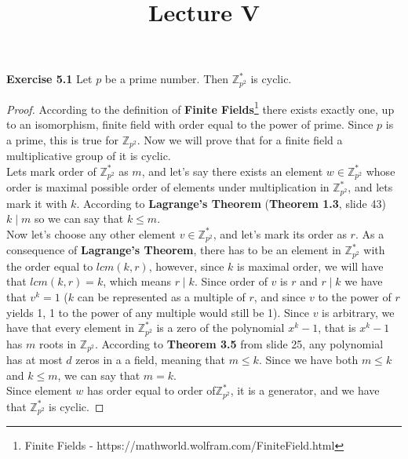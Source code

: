 \documentclass[a4paper]{article}
\title{\vspace{-2cm}Lecture V\vspace{-2cm}}
\date{}
\begin{document}
\maketitle
\noindent \textbf{Exercise 5.1}  Let $p$ be a prime number. Then $\mathbb{Z}^{*}_{p^2}$ is cyclic.
\begin{proof}
According to the definition of \textbf{Finite Fields}\footnote{Finite Fields - https://mathworld.wolfram.com/FiniteField.html} there exists exactly one, up to an isomorphism, finite field with order equal to the power of prime. Since $p$ is a prime, this is true for $\mathbb{Z}_{p^2}$. Now we will prove that for a finite field a multiplicative group of it is cyclic.\\
Lets mark order of $\mathbb{Z}_{p^2}^{*}$ as $m$, and let's say there exists an element $w \in \mathbb{Z}_{p^2}^{*}$ whose order is maximal possible order of elements under multiplication in $\mathbb{Z}_{p^2}^{*}$, and lets mark it with $k$. According to \textbf{Lagrange's Theorem} (\textbf{Theorem 1.3}, slide 43) $k \mid m$ so we can say that $k \leq m$.\\
Now let's choose any other element $v \in \mathbb{Z}_{p^2}^{*}$, and let's mark its order as $r$. As a consequence of \textbf{Lagrange's Theorem}, there has to be an element in $\mathbb{Z}_{p^2}^{*}$ with the order equal to $lcm(k,r)$, however, since $k$ is maximal order, we will have that $lcm(k,r)=k$, which means $r \mid k$. Since order of $v$ is $r$ and $r \mid k$ we have that $v^{k} = 1$ ($k$ can be represented as a multiple of $r$, and since $v$ to the power of $r$ yields 1, 1 to the power of any multiple would still be 1). Since $v$ is arbitrary, we have that every element in $\mathbb{Z}_{p^2}^{*}$ is a zero of the polynomial $x^k -1$, that is $x^k - 1$ has $m$ roots in $\mathbb{Z}_{p^2}$. According to \textbf{Theorem 3.5} from slide 25, any polynomial has at most $d$ zeros in a a field, meaning that $m \leq k$. Since we have both $m \leq k$ and $k \leq m$, we can say that $m = k$.\\
Since element $w$ has order equal to order of$\mathbb{Z}_{p^2}^{*}$, it is a generator, and we have that $\mathbb{Z}_{p^2}^{*}$ is cyclic.
\end{proof}
\end{document}
